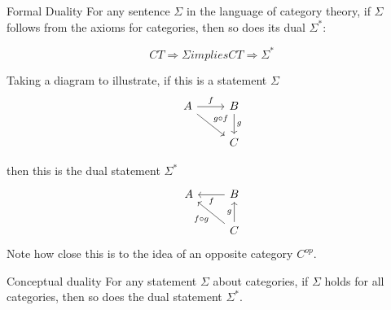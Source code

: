 \documentclass[../../notes.tex]{subfiles}
\begin{document}
\begin{proposition}{Formal Duality}
  For any sentence $\Sigma$ in the language of category theory, if $\Sigma$
  follows from the axioms for categories, then so does its dual $\Sigma^*$:

  $$ CT \Rightarrow \Sigma implies CT \Rightarrow \Sigma^* $$
\end{proposition}

Taking a diagram to illustrate, if this is a statement $\Sigma$
\[
  \begin{tikzcd}
    A \arrow[r, "f"] \arrow[dr, "g \circ f"] & B \arrow[d, "g"] \\
    & C
  \end{tikzcd}
\]

then this is the dual statement $\Sigma^*$
\[
  \begin{tikzcd}
    A  & B \arrow[l, "f"] \\
    & C \arrow[ul, "f \circ g"] \arrow[u, "g"]
  \end{tikzcd}
\]
Note how close this is to the idea of an opposite category $C^{op}$.

\begin{proposition}{Conceptual duality}
  For any statement $\Sigma$ about categories, if $\Sigma$ holds for
  all categories, then so does the dual statement $\Sigma^*$.
\end{proposition}
\end{document}
